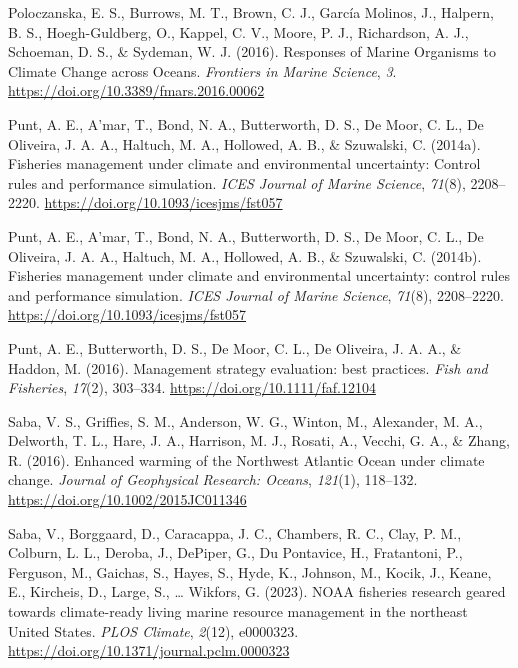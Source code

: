 \documentclass[
  12pt,
]{article}
\newlength{\cslhangindent}
\newenvironment{CSLReferences}[2] %
 {\begin{list}{}{%
  \setlength{\itemindent}{0pt}
  \setlength{\leftmargin}{0pt}
  \setlength{\parsep}{0pt}
  \ifodd #1
   \setlength{\leftmargin}{\cslhangindent}
   \setlength{\itemindent}{-1\cslhangindent}
  \fi
  \setlength{\itemsep}{#2\baselineskip}}}
 {\end{list}}
\begin{document}
\begin{CSLReferences}{1}{2}
Poloczanska, E. S., Burrows, M. T., Brown, C. J., García Molinos, J., Halpern, B. S., Hoegh-Guldberg, O., Kappel, C. V., Moore, P. J., Richardson, A. J., Schoeman, D. S., \& Sydeman, W. J. (2016). Responses of Marine Organisms to Climate Change across Oceans. \emph{Frontiers in Marine Science}, \emph{3}. \url{https://doi.org/10.3389/fmars.2016.00062}

Punt, A. E., A'mar, T., Bond, N. A., Butterworth, D. S., De Moor, C. L., De Oliveira, J. A. A., Haltuch, M. A., Hollowed, A. B., \& Szuwalski, C. (2014a). Fisheries management under climate and environmental uncertainty: Control rules and performance simulation. \emph{ICES Journal of Marine Science}, \emph{71}(8), 2208--2220. \url{https://doi.org/10.1093/icesjms/fst057}

Punt, A. E., A'mar, T., Bond, N. A., Butterworth, D. S., De Moor, C. L., De Oliveira, J. A. A., Haltuch, M. A., Hollowed, A. B., \& Szuwalski, C. (2014b). Fisheries management under climate and environmental uncertainty: control rules and performance simulation. \emph{ICES Journal of Marine Science}, \emph{71}(8), 2208--2220. \url{https://doi.org/10.1093/icesjms/fst057}

Punt, A. E., Butterworth, D. S., De Moor, C. L., De Oliveira, J. A. A., \& Haddon, M. (2016). Management strategy evaluation: best practices. \emph{Fish and Fisheries}, \emph{17}(2), 303--334. \url{https://doi.org/10.1111/faf.12104}

Saba, V. S., Griffies, S. M., Anderson, W. G., Winton, M., Alexander, M. A., Delworth, T. L., Hare, J. A., Harrison, M. J., Rosati, A., Vecchi, G. A., \& Zhang, R. (2016). Enhanced warming of the Northwest Atlantic Ocean under climate change. \emph{Journal of Geophysical Research: Oceans}, \emph{121}(1), 118--132. \url{https://doi.org/10.1002/2015JC011346}

Saba, V., Borggaard, D., Caracappa, J. C., Chambers, R. C., Clay, P. M., Colburn, L. L., Deroba, J., DePiper, G., Du Pontavice, H., Fratantoni, P., Ferguson, M., Gaichas, S., Hayes, S., Hyde, K., Johnson, M., Kocik, J., Keane, E., Kircheis, D., Large, S., \ldots{} Wikfors, G. (2023). NOAA fisheries research geared towards climate-ready living marine resource management in the northeast United States. \emph{PLOS Climate}, \emph{2}(12), e0000323. \url{https://doi.org/10.1371/journal.pclm.0000323}


\end{CSLReferences}
\end{document}
